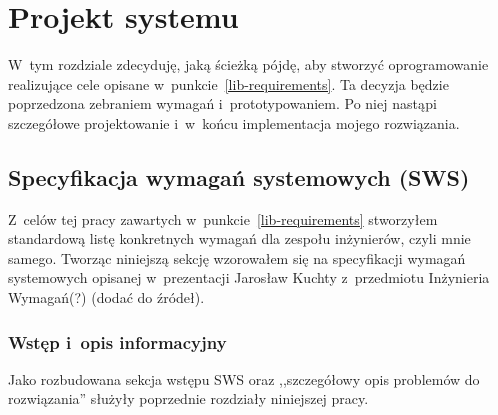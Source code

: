 \chapter{Projekt systemu}
W~tym rozdziale zdecyduję, jaką ścieżką pójdę, aby stworzyć oprogramowanie realizujące cele opisane w~punkcie~\ref{lib-requirements}.
Ta decyzja będzie poprzedzona zebraniem wymagań i~prototypowaniem.
Po niej nastąpi szczegółowe projektowanie i~w~końcu implementacja mojego rozwiązania.



\section{Specyfikacja wymagań systemowych (SWS)}
Z~celów tej pracy zawartych w~punkcie~\ref{lib-requirements} stworzyłem standardową listę konkretnych wymagań dla zespołu inżynierów, czyli mnie samego.
Tworząc niniejszą sekcję wzorowałem się na specyfikacji wymagań systemowych opisanej w~prezentacji Jarosław Kuchty z~przedmiotu Inżynieria Wymagań(?) (dodać do źródeł).


\subsection{Wstęp i~opis informacyjny}
Jako rozbudowana sekcja wstępu SWS oraz ,,szczegółowy opis problemów do rozwiązania'' służyły poprzednie rozdziały niniejszej pracy.


